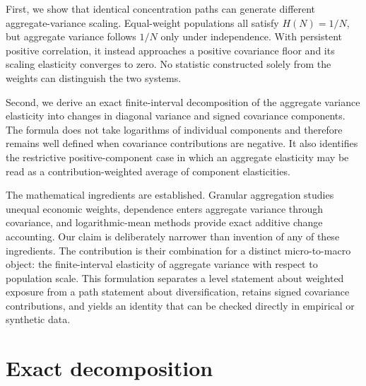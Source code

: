\documentclass[a4paper,fleqn]{cas-dc}
\begin{document}
First, we show that identical concentration paths can generate different
aggregate-variance scaling. Equal-weight populations all satisfy
$H(N)=1/N$, but aggregate variance follows $1/N$ only under independence.
With persistent positive correlation, it instead approaches a positive
covariance floor and its scaling elasticity converges to zero. No
statistic constructed solely from the weights can distinguish the two
systems.

Second, we derive an exact finite-interval decomposition of the aggregate
variance elasticity into changes in diagonal variance and signed
covariance components. The formula does not take logarithms of individual
components and therefore remains well defined when covariance
contributions are negative. It also identifies the restrictive
positive-component case in which an aggregate elasticity may be read as
a contribution-weighted average of component elasticities.

The mathematical ingredients are established. Granular aggregation
studies unequal economic weights, dependence enters aggregate variance
through covariance, and logarithmic-mean methods provide exact additive
change accounting. Our claim is deliberately narrower than invention of
any of these ingredients. The contribution is their combination for a
distinct micro-to-macro object: the finite-interval elasticity of
aggregate variance with respect to population scale. This formulation
separates a level statement about weighted exposure from a path
statement about diversification, retains signed covariance
contributions, and yields an identity that can be checked directly in
empirical or synthetic data.

\section{Exact decomposition}
\label{sec:exact_decomposition}
\end{document}
